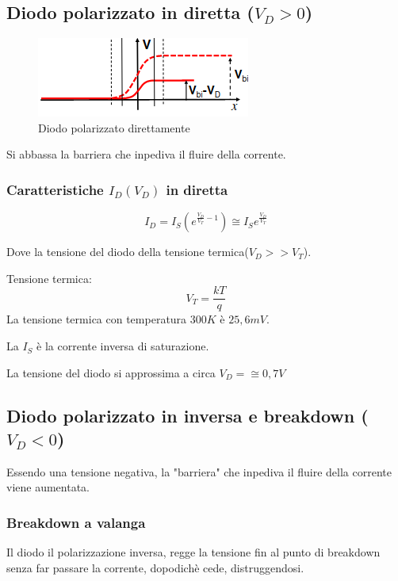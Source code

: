\subsection{Diodo polarizzato in diretta ($V_D>0$)}
\begin{figure}[H]
    \centering
    \includegraphics[width=0.4\linewidth]{imgs/polarizzato-direttamente}
    \caption{Diodo polarizzato direttamente}
    \label{fig:polarizzato-direttamente}
\end{figure}

Si abbassa la barriera che inpediva il fluire della corrente.
\subsubsection{Caratteristiche $I_D(V_D)$ in diretta}
\begin{equation}
    I_D = I_S(e^{\frac{V_D}{V_T} - 1}) \cong I_{S}e^{\frac{V_D}{V_T}}
\end{equation}

Dove la tensione del diodo della tensione termica($V_D >> V_T$).

Tensione termica:
\begin{equation*}
    V_T = \frac{kT}{q}
\end{equation*}
La tensione termica con temperatura $300K$ è $25,6mV$.

La $I_S$ è la corrente inversa di saturazione.

La tensione del diodo si approssima a circa $V_D = \cong 0,7V$

\subsection{Diodo polarizzato in inversa e breakdown ($V_D < 0$)}

Essendo una tensione negativa, la "barriera" che inpediva il fluire della corrente viene aumentata.

\subsubsection{Breakdown a valanga}
Il diodo il polarizzazione inversa, regge la tensione fin al punto di breakdown senza far passare la corrente,
dopodichè cede, distruggendosi.

